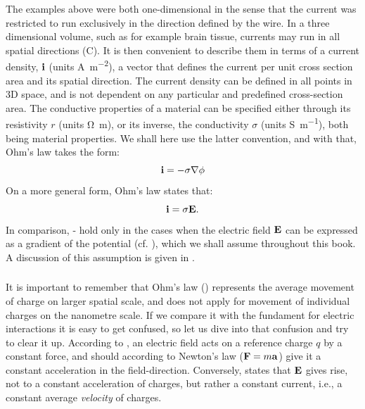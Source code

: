 The examples above were both one-dimensional in the sense that the current was restricted to run exclusively in the direction defined by the wire. In a three dimensional volume, such as for example brain tissue, currents may run in all spatial directions (C). It is then convenient to describe them in terms of a current density, ${\bf i}$ (units \si{\ampere\per\square\metre}), a vector that defines the current per unit cross section area and its spatial direction. The current density can be defined in all points in 3D space, and is not dependent on any particular and predefined cross-section area. The conductive properties of a material can be specified either through its resistivity $r$ (units \si{\ohm\metre}), or its inverse, the conductivity $\sigma$ (units \si{\siemens\per\metre}), both being material properties. We shall here use the latter convention, and with that, Ohm's law takes the form:
\begin{equation}
{\bf i} = - \sigma {\bf \nabla} \phi
\label{eq:Basics:Ohm_3D_phi}
\end{equation}
%
On a more general form, Ohm's law states that:
\begin{equation}
{\bf i} = \sigma {\bf E}.
\label{eq:Basics:Ohm_general}
\end{equation}
In comparison, - hold only in the cases when the electric field ${\bf E}$ can be expressed as a gradient of the potential (cf. ), which we shall assume throughout this book. 
A discussion of this assumption is given in .


\subsubsection{}
\label{sec:Basics:Note}
It is important to remember that Ohm's law () represents the average movement of charge on larger spatial scale, and does not apply for movement of individual charges on the nanometre scale. If we compare it with the fundament  for electric interactions it is easy to get confused, so let us dive into that confusion and try to clear it up. According to , an electric field acts on a reference charge $q$ by a constant force, and should according to Newton's law (${\bf F} = m{\bf a}$) give it a constant acceleration in the field-direction. Conversely,  states that ${\bf E}$ gives rise, not to a constant acceleration of charges, but rather a constant current, i.e., a constant average \textit{velocity} of charges.

